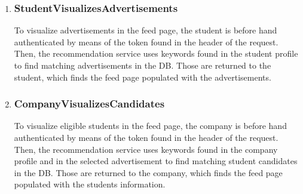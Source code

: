 \begin{enumerate}[label=\textbf{RV\arabic* -}]
\item \subsubsection{StudentVisualizesAdvertisements}

To visualize advertisements in the feed page, the student is before hand authenticated by means of the token found in the header of the request.
Then, the recommendation service uses keywords found in the student profile to find matching advertisements in the DB.
Those are returned to the student, which finds the feed page populated with the advertisements.

\begin{figure}[H]
    \centering
\end{figure}

\item \subsubsection{CompanyVisualizesCandidates}

To visualize eligible students in the feed page, the company is before hand authenticated by means of the token found in the header of the request.
Then, the recommendation service uses keywords found in the company profile and in the selected advertisement to find matching student candidates in the DB.
Those are returned to the company, which finds the feed page populated with the students information.

\begin{figure}[H]
    \centering
\end{figure}


\end{enumerate}
